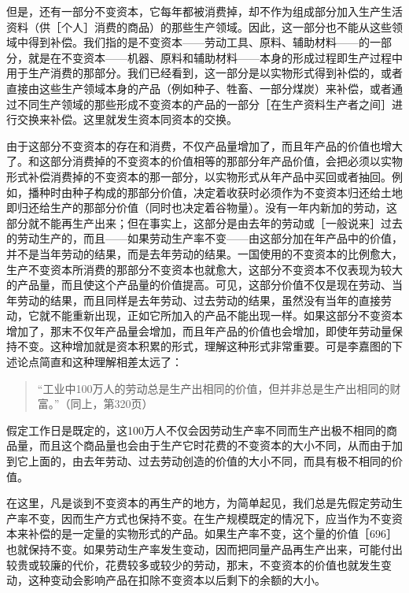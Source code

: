 但是，还有一部分不变资本，它每年都被消费掉，却不作为组成部分加入生产生活资料（供［个人］消费的商品）的那些生产领域。因此，这一部分也不能从这些领域中得到补偿。我们指的是不变资本——劳动工具、原料、辅助材料——的一部分，就是在不变资本——机器、原料和辅助材料——本身的形成过程即生产过程中用于生产消费的那部分。我们已经看到，这一部分是以实物形式得到补偿的，或者直接由这些生产领域本身的产品（例如种子、牲畜、一部分煤炭）来补偿，或者通过不同生产领域的那些形成不变资本的产品的一部分［在生产资料生产者之间］进行交换来补偿。这里就发生资本同资本的交换。

由于这部分不变资本的存在和消费，不仅产品量增加了，而且年产品的价值也增大了。和这部分消费掉的不变资本的价值相等的那部分年产品价值，会把必须以实物形式补偿消费掉的不变资本的那一部分，以实物形式从年产品中买回或者抽回。例如，播种时由种子构成的那部分价值，决定着收获时必须作为不变资本归还给土地即归还给生产的那部分价值（同时也决定着谷物量）。没有一年内新加的劳动，这部分就不能再生产出来；但在事实上，这部分是由去年的劳动或［一般说来］过去的劳动生产的，而且——如果劳动生产率不变——由这部分加在年产品中的价值，并不是当年劳动的结果，而是去年劳动的结果。一国使用的不变资本的比例愈大，生产不变资本所消费的那部分不变资本也就愈大，这部分不变资本不仅表现为较大的产品量，而且使这个产品量的价值提高。可见，这部分价值不仅是现在劳动、当年劳动的结果，而且同样是去年劳动、过去劳动的结果，虽然没有当年的直接劳动，它就不能重新出现，正如它所加入的产品不能出现一样。如果这部分不变资本增加了，那末不仅年产品量会增加，而且年产品的价值也会增加，即使年劳动量保持不变。这种增加就是资本积累的形式，理解这种形式非常重要。可是李嘉图的下述论点简直和这种理解相差太远了：

\begin{quote}{“工业中100万人的劳动总是生产出相同的价值，但并非总是生产出相同的财富。”（同上，第320页）}\end{quote}

假定工作日是既定的，这100万人不仅会因劳动生产率不同而生产出极不相同的商品量，而且这个商品量也会由于生产它时花费的不变资本的大小不同，从而由于加到它上面的，由去年劳动、过去劳动创造的价值的大小不同，而具有极不相同的价值。


在这里，凡是谈到不变资本的再生产的地方，为简单起见，我们总是先假定劳动生产率不变，因而生产方式也保持不变。在生产规模既定的情况下，应当作为不变资本来补偿的是一定量的实物形式的产品。如果生产率不变，这个量的价值［696］也就保持不变。如果劳动生产率发生变动，因而把同量产品再生产出来，可能付出较贵或较廉的代价，花费较多或较少的劳动，那末，不变资本的价值也就发生变动，这种变动会影响产品在扣除不变资本以后剩下的余额的大小。

